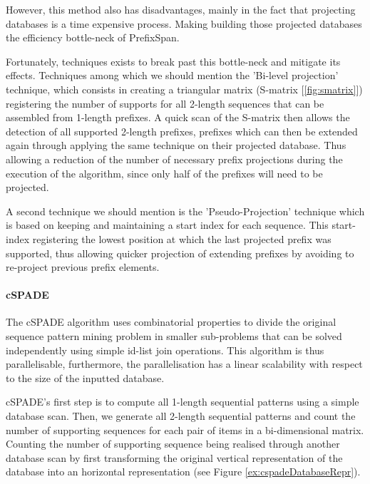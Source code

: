 \documentclass{eplmastersthesis}
\begin{document}
However, this method also has disadvantages, mainly in the fact that projecting databases is a time expensive process. Making building those projected databases the efficiency bottle-neck of PrefixSpan. \newline

Fortunately, techniques exists to break past this bottle-neck and mitigate its effects. Techniques among which we should mention the 'Bi-level projection' technique, which consists in creating a triangular matrix (S-matrix [\ref{fig:smatrix}]) registering the number of supports for all 2-length sequences that can be assembled from 1-length prefixes. A quick scan of the S-matrix then allows the detection of all supported 2-length prefixes, prefixes which can then be extended again through applying the same technique on their projected database. Thus allowing a reduction of the number of necessary prefix projections during the execution of the algorithm, since only half of the prefixes will need to be projected. \newline

A second technique we should mention is the 'Pseudo-Projection' technique which is based on keeping and maintaining a start index for each sequence. This start-index registering the lowest position at which the last projected prefix was supported, thus allowing quicker projection of extending prefixes by avoiding to re-project previous prefix elements.

\paragraph{cSPADE}

The cSPADE algorithm \cite{zaki2001spade} uses combinatorial properties to divide the original sequence pattern mining problem in smaller sub-problems that can be solved independently using simple id-list join operations. This algorithm is thus parallelisable, furthermore, the parallelisation has a linear scalability with respect to the size of the inputted database. \newline

cSPADE's first step is to compute all 1-length sequential patterns using a simple database scan. Then, we generate all 2-length sequential patterns and count the number of supporting sequences for each pair of items in a bi-dimensional matrix. Counting the number of supporting sequence being realised through another database scan by first transforming the original vertical representation of the database into an horizontal representation (see Figure \ref{ex:cspadeDatabaseRepr}).
\end{document}
